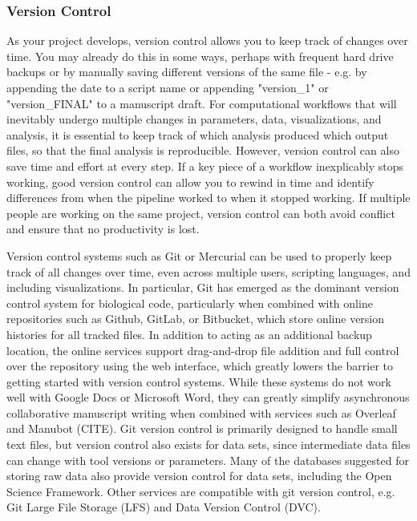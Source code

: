 \documentclass[10pt,letterpaper]{article}
\begin{document}
 
\subsubsection*{Version Control} 

As your project develops, version control allows you to keep track of changes over time. 
You may already do this in some ways, perhaps with frequent hard drive backups or by manually saving different versions of the same file  - e.g. by appending the date to a script name or appending "version\_1" or "version\_FINAL" to a manuscript draft. 
For computational workflows that will inevitably undergo multiple changes in parameters, data, visualizations, and analysis, it is essential to keep track of which analysis produced which output files, so that the final analysis is reproducible. 
However, version control can also save time and effort at every step. 
If a key piece of a workflow inexplicably stops working, good version control can allow you to rewind in time and identify differences from when the pipeline worked to when it stopped working. 
If multiple people are working on the same project, version control can both avoid conflict and ensure that no productivity is lost. 

Version control systems such as Git or Mercurial can be used to properly keep track of all changes over time, even across multiple users, scripting languages, and including visualizations. 
In particular, Git has emerged as the dominant version control system for biological code, particularly when combined with online repositories such as Github, GitLab, or Bitbucket, which store online version histories for all tracked files.
In addition to acting as an additional backup location, the online services support drag-and-drop file addition and full control over the repository using the web interface, which greatly lowers the barrier to getting started with version control systems. 
While these systems do not work well with Google Docs or Microsoft Word, they can greatly simplify asynchronous collaborative manuscript writing when combined with services such as Overleaf and Manubot (CITE). 
Git version control is primarily designed to handle small text files, but version control also exists for data sets, since intermediate data files can change with tool versions or parameters. 
Many of the databases suggested for storing raw data also provide version control for data sets, including the Open Science Framework. 
Other services are compatible with git version control, e.g. Git Large File Storage (LFS) and Data Version Control (DVC).
\end{document}
